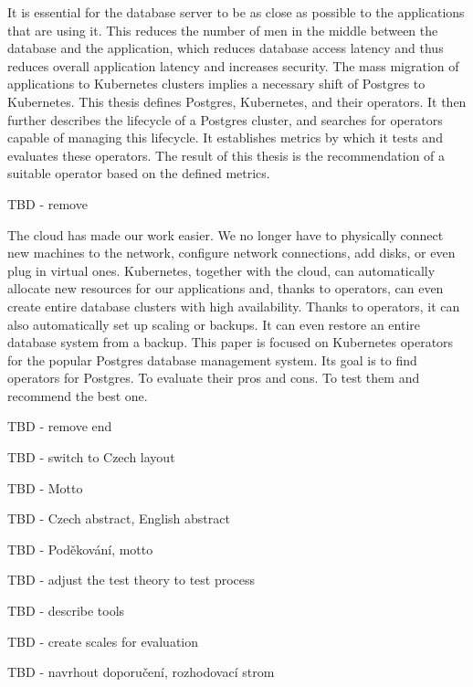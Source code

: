 
It is essential for the database server to be as close as possible to the applications that are using it. This reduces the number of men in the middle between the database and the application, which reduces database access latency and thus reduces overall application latency and increases security. The mass migration of applications to Kubernetes clusters implies a necessary shift of Postgres to Kubernetes. This thesis defines Postgres, Kubernetes, and their operators. It then further describes the lifecycle of a Postgres cluster, and searches for operators capable of managing this lifecycle. It establishes metrics by which it tests and evaluates these operators.  The result of this thesis is the recommendation of a suitable operator based on the defined metrics.

TBD - remove

The cloud has made our work easier. We no longer have to physically connect new machines to the network, configure network connections, add disks, or even plug in virtual ones. Kubernetes, together with the cloud, can automatically allocate new resources for our applications and, thanks to operators, can even create entire database clusters with high availability. Thanks to operators, it can also automatically set up scaling or backups. It can even restore an entire database system from a backup. This paper is focused on Kubernetes operators for the popular Postgres database management system. Its goal is to find operators for Postgres. To evaluate their pros and cons. To test them and recommend the best one.

TBD - remove end

TBD - switch to Czech layout

TBD - Motto

TBD - Czech abstract, English abstract

TBD - Poděkování, motto

TBD - adjust the test theory to test process

TBD - describe tools

TBD - create scales for evaluation

TBD - navrhout doporučení, rozhodovací strom

